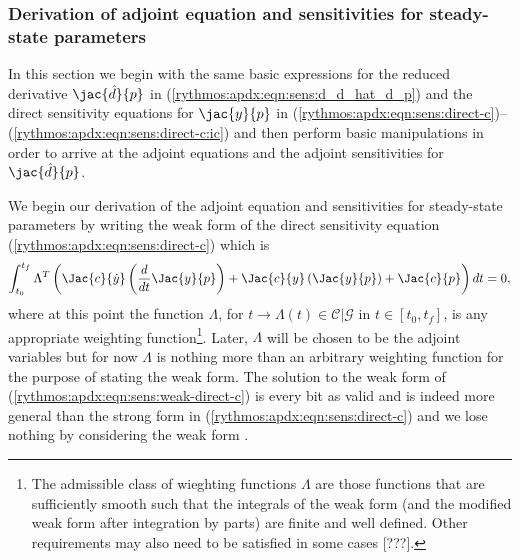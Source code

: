 \documentclass[pdf,ps2pdf,11pt]{SANDreport}
\begin{document}
\subsubsection{Derivation of adjoint equation and sensitivities for steady-state parameters}
\label{rythmos:app:adj-equ-derivation}

In this section we begin with the same basic expressions for the reduced
derivative $\jac{\hat{d}}{p}$ in (\ref{rythmos:apdx:eqn:sens:d_d_hat_d_p}) and
the direct sensitivity equations for $\jac{y}{p}$ in
(\ref{rythmos:apdx:eqn:sens:direct-c})--(\ref{rythmos:apdx:eqn:sens:direct-c:ic})
and then perform basic manipulations in order to arrive at the adjoint
equations and the adjoint sensitivities for $\jac{\hat{d}}{p}$.

We begin our derivation of the adjoint equation and sensitivities for
steady-state parameters by writing the weak form of the direct sensitivity
equation (\ref{rythmos:apdx:eqn:sens:direct-c}) which is
%
\begin{equation}
\int_{t_0}^{t_f} \Lambda^T \left(
\Jac{c}{\dot{y}} \left(\frac{d}{dt} \Jac{y}{p} \right)
+ \Jac{c}{y} \left(\Jac{y}{p}\right)
+ \Jac{c}{p}
\right) dt = 0,
\label{rythmos:apdx:eqn:sens:weak-direct-c}
\end{equation}
%
where at this point the function $\Lambda$, for
$t\rightarrow\Lambda(t)\in\mathcal{C}|\mathcal{G}$ in $t\in[t_0,t_f]$, is any
appropriate weighting function\footnote{The admissible class of wieghting
functions $\Lambda$ are those functions that are sufficiently smooth such that
the integrals of the weak form (and the modified weak form after integration
by parts) are finite and well defined.  Other requirements may also need to be
satisfied in some cases [???].}.  Later, $\Lambda$ will be chosen to be the
adjoint variables but for now $\Lambda$ is nothing more than an arbitrary
weighting function for the purpose of stating the weak form.  The solution to
the weak form of (\ref{rythmos:apdx:eqn:sens:weak-direct-c}) is every bit as
valid and is indeed more general than the strong form in
(\ref{rythmos:apdx:eqn:sens:direct-c}) and we lose nothing by considering the
weak form {}\cite{BeckerCareyOden-FE}.
\end{document}
